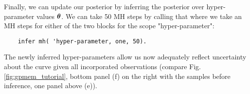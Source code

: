 Finally, we can update our posterior by inferring the posterior over hyper-parameter values $\bm{\theta}$.
We can take 50 \ac{MH} steps by calling that where we take an \ac{MH} steps for either of the two blocks for the scope "hyper-parameter": 
   \begin{lstlisting}
    infer mh( 'hyper-parameter, one, 50).
    \end{lstlisting}
The newly inferred hyper-parameters allow us now adequately reflect uncertainty
about the curve given all incorporated observations (compare
Fig. \ref{fig:gpmem_tutorial}, bottom panel (f) on  the right with the samples
before inference, one panel above (e)).

